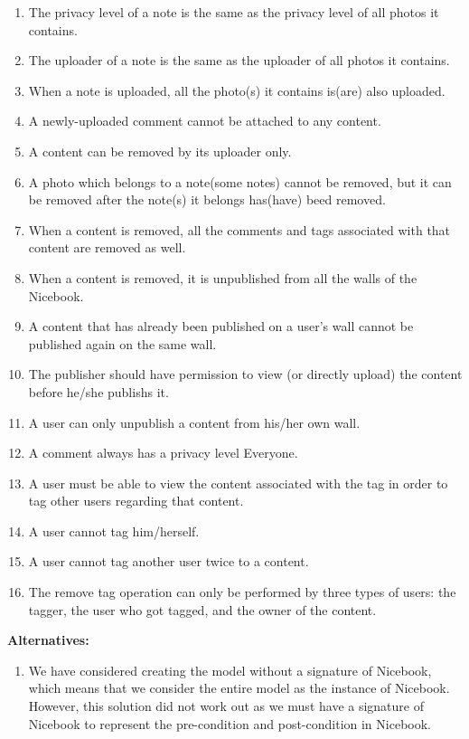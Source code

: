 \documentclass[titlepage]{article}
\begin{document}
\begin{enumerate}[\bf\large 1.]
\begin{enumerate}[1)]
        \item The privacy level of a note is the same as the privacy level of all photos it contains.
        \item The uploader of a note is the same as the uploader of all photos it contains.
        \item When a note is uploaded, all the photo(s) it contains is(are) also uploaded.
        \item A newly-uploaded comment cannot be attached to any content.
        \item A content can be removed by its uploader only.
        \item A photo which belongs to a note(some notes) cannot be removed, but it can be removed after the note(s) it belongs has(have) beed removed.
        \item When a content is removed, all the comments and tags associated with that content are removed as well.
        \item When a content is removed, it is unpublished from all the walls of the Nicebook.
        \item A content that has already been published on a user’s wall cannot be published again on the same wall.
        \item The publisher should have permission to view (or directly upload) the content before he/she publishs it.
        \item A user can only unpublish a content from his/her own wall.
        \item A comment always has a privacy level Everyone.
        \item A user must be able to view the content associated with the tag in order to tag other users regarding that content.
        \item A user cannot tag him/herself.
        \item A user cannot tag another user twice to a content. 
        \item The remove tag operation can only be performed by three types of users: the tagger, the user who got tagged, and the owner of the content.
    \end{enumerate}
    \textbf{Alternatives: }
    \begin{enumerate}[1)]
        \item We have considered creating the model without a signature of Nicebook, which means that we consider the entire model as the instance of Nicebook. However, this solution did not work out as we must have a signature of Nicebook to represent the pre-condition and post-condition in Nicebook.

\end{enumerate}
\end{enumerate}
\end{document}
